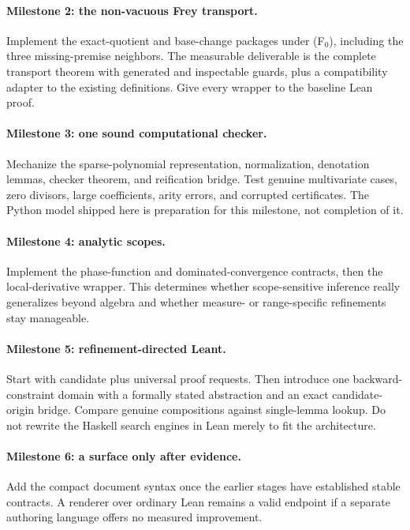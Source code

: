 \documentclass[11pt,letterpaper]{article}
\theoremstyle{definition}\newtheorem{definition}[theorem]{Definition}
\begin{document}
\paragraph{Milestone 2: the non-vacuous Frey transport.}
Implement the exact-quotient and base-change packages under (F$_0$), including the three missing-premise neighbors. The measurable deliverable is the complete transport theorem with generated and inspectable guards, plus a compatibility adapter to the existing definitions. Give every wrapper to the baseline Lean proof.

\paragraph{Milestone 3: one sound computational checker.}
Mechanize the sparse-polynomial representation, normalization, denotation lemmas, checker theorem, and reification bridge. Test genuine multivariate cases, zero divisors, large coefficients, arity errors, and corrupted certificates. The Python model shipped here is preparation for this milestone, not completion of it.

\paragraph{Milestone 4: analytic scopes.}
Implement the phase-function and dominated-convergence contracts, then the local-derivative wrapper. This determines whether scope-sensitive inference really generalizes beyond algebra and whether measure- or range-specific refinements stay manageable.

\paragraph{Milestone 5: refinement-directed Leant.}
Start with candidate plus universal proof requests. Then introduce one backward-constraint domain with a formally stated abstraction and an exact candidate-origin bridge. Compare genuine compositions against single-lemma lookup. Do not rewrite the Haskell search engines in Lean merely to fit the architecture.

\paragraph{Milestone 6: a surface only after evidence.}
Add the compact document syntax once the earlier stages have established stable contracts. A renderer over ordinary Lean remains a valid endpoint if a separate authoring language offers no measured improvement.
\end{document}
